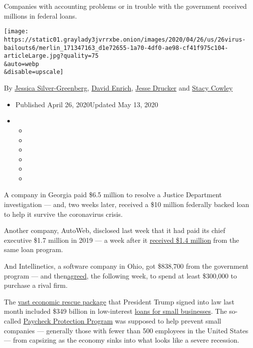 Companies with accounting problems or in trouble with the government
received millions in federal loans.

\texttt{[image: https://static01.graylady3jvrrxbe.onion/images/2020/04/26/us/26virus-bailouts6/merlin\_171347163\_d1e72655-1a70-4df0-ae98-cf41f975c104-articleLarge.jpg?quality=75\\\&auto=webp\\\&disable=upscale]}

By
\href{https://www.nytimes3xbfgragh.onion/by/jessica-silver-greenberg}{Jessica
Silver-Greenberg},
\href{https://www.nytimes3xbfgragh.onion/by/david-enrich}{David Enrich},
\href{https://www.nytimes3xbfgragh.onion/by/jesse-drucker}{Jesse
Drucker} and
\href{https://www.nytimes3xbfgragh.onion/by/stacy-cowley}{Stacy Cowley}

\begin{itemize}
\item
  Published April 26, 2020Updated May 13, 2020
\item
  \begin{itemize}
  \item
  \item
  \item
  \item
  \item
  \item
  \end{itemize}
\end{itemize}

A company in Georgia paid \$6.5 million to resolve a Justice Department
investigation --- and, two weeks later, received a \$10 million
federally backed loan to help it survive the coronavirus crisis.

Another company, AutoWeb, disclosed last week that it had paid its chief
executive \$1.7 million in 2019 --- a week after it
\href{https://investor.autoweb.com/news-releases/news-release-details/autoweb-secures-14-million-loan-through-cares-act-paycheck}{received
\$1.4 million} from the same loan program.

And Intellinetics, a software company in Ohio, got \$838,700 from the
government program --- and
then\href{https://www.sec.gov/Archives/edgar/data/1081745/000149315220007017/form8k.htm}{agreed},
the following week, to spend at least \$300,000 to purchase a rival
firm.

The
\href{https://www.nytimes3xbfgragh.onion/2020/03/26/business/economy/coronavirus-relief-bill.html}{vast
economic rescue package} that President Trump signed into law last month
included \$349 billion in low-interest
\href{https://www.nytimes3xbfgragh.onion/2020/05/13/business/paycheck-protection-program-small-business.html}{loans
for small businesses}. The so-called
\href{https://www.nytimes3xbfgragh.onion/2020/05/06/business/small-businesses-loans-ppp-coronavirus.html}{Paycheck
Protection Program} was supposed to help prevent small companies ---
generally those with fewer than 500 employees in the United States ---
from capsizing as the economy sinks into what looks like a severe
recession.

